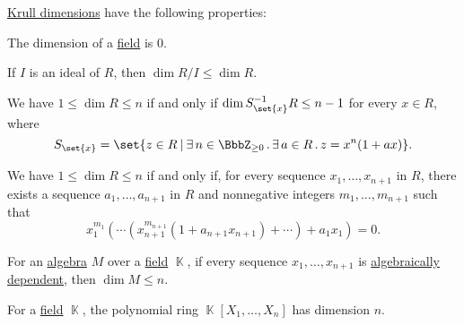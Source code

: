 \begin{proposition}\label{thm:def:krull_dimension}
  \hyperref[def:krull_dimension]{Krull dimensions} have the following properties:
  \begin{thmenum}
     The dimension of a \hyperref[def:field]{field} is \( 0 \).

     If \( I \) is an ideal of \( R \), then \( \dim R / I \leq \dim R \).

     We have \( 1 \leq \dim R \leq n \) if and only if \( \dim S_{\set{ x }}^{-1} R \leq n - 1 \) for every \( x \in R \), where
    \begin{equation*}
      S_{\set{ x }} = \set{ z \in R \given \qexists {n \in \BbbZ_{\geq 0}} \qexists {a \in R} z = x^n (1 + ax) }.
    \end{equation*}

     We have \( 1 \leq \dim R \leq n \) if and only if, for every sequence \( x_1, \ldots, x_{n+1} \) in \( R \), there exists a sequence \( a_1, \ldots, a_{n+1} \) in \( R \) and nonnegative integers \( m_1, \ldots, m_{n+1} \) such that
    \begin{equation*}
      x_1^{m_1} ( \cdots ( x_{n+1}^{m_{n+1}} ( 1 + a_{n+1} x_{n+1} ) + \cdots ) + a_1 x_1 ) = 0.
    \end{equation*}

     For an \hyperref[def:algebra_over_ring]{algebra} \( M \) over a \hyperref[def:field]{field} \( \BbbK \), if every sequence \( x_1, \ldots, x_{n+1} \) is \hyperref[def:algebraic_dependence]{algebraically dependent}, then \( \dim M \leq n \).

     For a \hyperref[def:field]{field} \( \BbbK \), the polynomial ring \( \BbbK[X_1, \ldots, X_n] \) has dimension \( n \).
  \end{thmenum}
\end{proposition}
